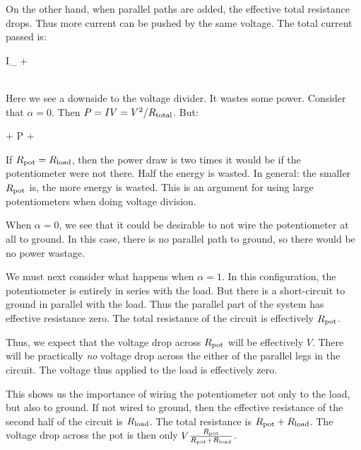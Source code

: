 \documentclass[11pt, oneside]{amsart}
\begin{document}
On the other hand, when parallel paths are added, the effective total
resistance drops. Thus more current can be pushed by the same voltage.
The total current passed is:

\begin{nedqn}
  I_
\eqcol
   + 
\\
  \Rtot
\eqcol
\\
\eqcol
\end{nedqn}

\noindent
Here we see a downside to the voltage divider. It wastes some power.
Consider that $\alpha = 0$. Then $P = IV = V^2/R_\text{total}$. But:

\begin{nedqn}
\eqcol
   + 
  P
\eqcol
   + 
\end{nedqn}

If $R_\text{pot} = R_\text{load}$, then the power draw is two times it would be if the
potentiometer were not there. Half the energy is wasted. In general: the
smaller $R_\text{pot}$ is, the more energy is wasted. This is an argument for
using large potentiometers when doing voltage division.

When $\alpha = 0$, we see that it could be desirable to not wire the
potentiometer at all to ground. In this case, there is no parallel path
to ground, so there would be no power wastage.

We must next consider what happens when $\alpha = 1$. In this
configuration, the potentiometer is entirely in series with the load.
But there is a short-circuit to ground in parallel with the load. Thus
the parallel part of the system has effective resistance zero. The total
resistance of the circuit is effectively $R_\text{pot}$.

Thus, we expect that the voltage drop across $R_\text{pot}$ will be effectively
$V$. There will be practically \emph{no} voltage drop across the either
of the parallel legs in the circuit. The voltage thus applied to the
load is effectively zero.

This shows us the importance of wiring the potentiometer not only to the
load, but also to ground. If not wired to ground, then the effective
resistance of the second half of the circuit is $R_\text{load}$. The total
resistance is $R_\text{pot} + R_\text{load}$. The voltage drop across the pot is then
only $V \frac{R_\text{pot}}{R_\text{pot} + R_\text{load}}$.
\end{document}
